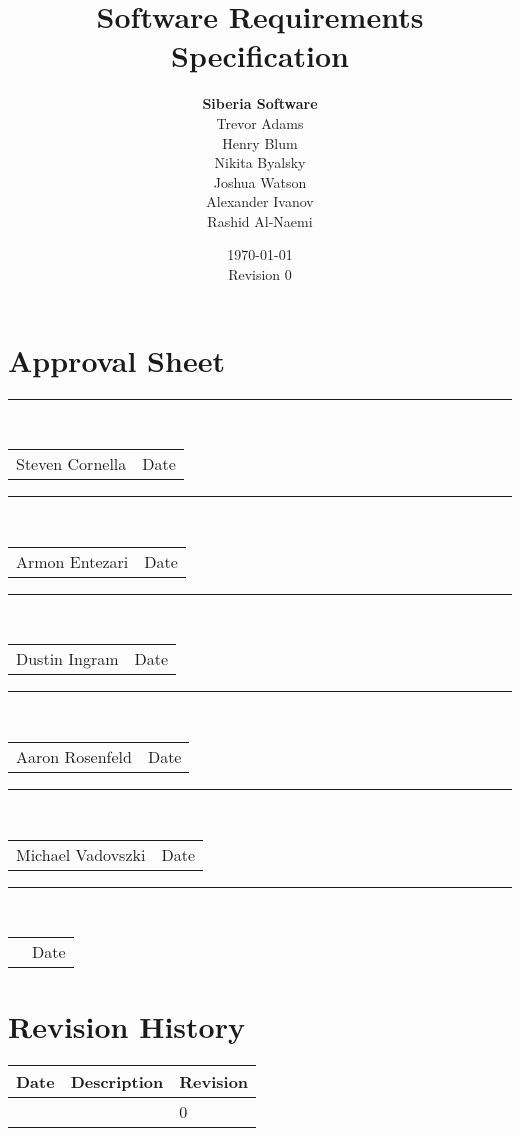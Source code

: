 \documentclass[letterpaper,titlepage]{article}
\makeatletter
\newcommand{\sigline}[1]{
  \rule{\textwidth}{.5pt}\\
  \begin{tabular*}{\textwidth}{@{\extracolsep{\fill}} l r }
  #1 & Date\\[2cm]
  \end{tabular*}
}
\makeatother
\begin{document}

\title{\textbf{Software Requirements Specification}}
\author{\textbf{Siberia Software}\\
        Trevor Adams\\
        Henry Blum\\
        Nikita Byalsky\\
        Joshua Watson\\
        Alexander Ivanov\\
        Rashid Al-Naemi
	}
\date{\today\\Revision 0}
\maketitle
\pagebreak

\section*{Approval Sheet}
\thispagestyle{plain}
\vspace{3cm}
\sigline{Steven Cornella}
\sigline{Armon Entezari}
\sigline{Dustin Ingram}
\sigline{Aaron Rosenfeld}
\sigline{Michael Vadovszki}
\sigline{}
\pagebreak

\thispagestyle{plain}
\section*{Revision History}
    \bigskip
    \begin{center}
	    \begin{tabular*}{.8\textwidth}{@{\extracolsep{\fill}} lll }
        \bf Date            & \bf Description               & \bf Revision\\
        \hline \hline
               &              & 0\\
        \hline
    \end{tabular*}
    \end{center}
\pagebreak

\thispagestyle{plain}
\setcounter{tocdepth}{3}
\tableofcontents
\pagebreak

\setcounter{page}{1}






\end{document}
